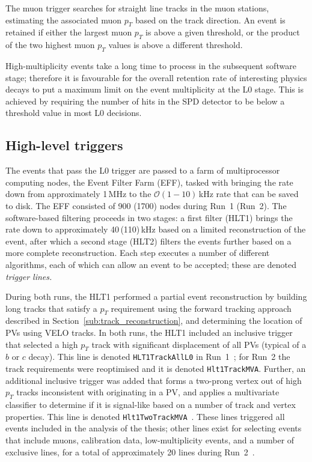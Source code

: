 The muon trigger searches for straight line tracks in the muon stations, estimating the associated muon $p_T$ based on the track direction. An event is retained if either the largest muon $p_T$ is above a given threshold, or the product of the two highest muon $p_T$ values is above a different threshold.

High-multiplicity events take a long time to process in the subsequent software stage; therefore it is favourable for the overall retention rate of interesting physics decays to put a maximum limit on the event multiplicity at the L0 stage. This is achieved by requiring the number of hits in the SPD detector to be below a threshold value in most L0 decisions.


\subsection{High-level triggers} %
\label{sub:high_level_triggers}

The events that pass the L0 trigger are passed to a farm of multiprocessor computing nodes, the Event Filter Farm (EFF), tasked with bringing the rate down from approximately 1\,MHz to the $\mathcal O(1-10)$\,kHz rate that can be saved to disk. The EFF consisted of 900 (1700) nodes during Run~1 (Run~2). The software-based filtering proceeds in two stages: a first filter (HLT1) brings the rate down to approximately 40\,(110)\,kHz based on a limited reconstruction of the event,  after which a second stage  (HLT2) filters the events further based on a more complete reconstruction. Each step executes a number of different algorithms, each of which can allow an event to be accepted; these are denoted \emph{trigger lines.}

During both runs, the HLT1 performed a partial event reconstruction by building long tracks that satisfy a $p_T$ requirement using the forward tracking approach described in Section~\ref{sub:track_reconstruction}, and determining the location of PVs using VELO tracks. In both runs, the HLT1 included an inclusive trigger that selected a high $p_T$ track with significant displacement of all PVs (typical of a $b$ or $c$ decay). This line is denoted \texttt{HLT1TrackAllL0} in Run~1~\cite{Trigger-Performance}; for Run~2 the track requirements were reoptimised and it is denoted \texttt{Hlt1TrackMVA}. Further, an additional inclusive trigger was added that forms a two-prong vertex out of high $p_T$ tracks inconsistent with originating in a PV, and applies a multivariate classifier to determine if it is signal-like based on a number of track and vertex properties. This line is denoted \texttt{Hlt1TwoTrackMVA}~\cite{Trigger-Performance2}. These lines triggered all events included in the analysis of the thesis; other lines exist for selecting events that include muons, calibration data, low-multiplicity events, and a number of exclusive lines, for a total of approximately 20 lines during Run~2~\cite{Trigger-Performance2}.

